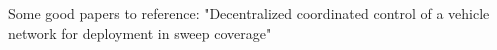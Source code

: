 Some good papers to reference:
"Decentralized  coordinated  control  of  a vehicle  network for  deployment in sweep coverage"
